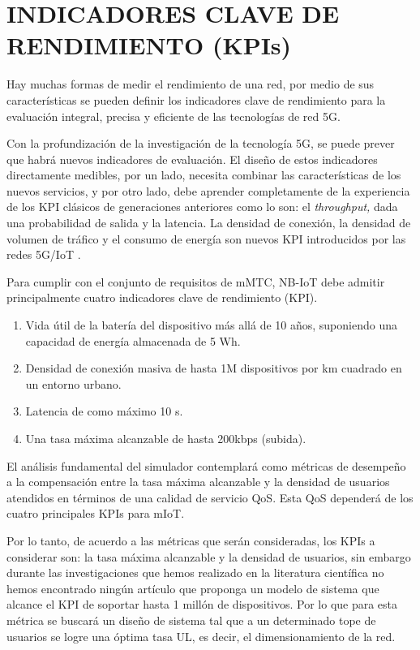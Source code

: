 \section{INDICADORES CLAVE DE RENDIMIENTO (KPIs)}

Hay muchas formas de medir el rendimiento de una red, por medio de sus características se pueden definir los indicadores clave de rendimiento para la evaluación integral, precisa y eficiente de las tecnologías de red 5G.\newline

Con la profundización de la investigación de la tecnología 5G, se puede prever que habrá nuevos indicadores de evaluación. El diseño de estos indicadores directamente medibles, por un lado, necesita combinar las características de los nuevos servicios, y por otro lado, debe aprender completamente de la experiencia de los KPI clásicos de generaciones anteriores como lo son: el \textit{throughput, }dada una\textit{ }probabilidad de salida y la latencia. La densidad de conexión, la densidad de volumen de tráfico y el consumo de energía son nuevos KPI introducidos por las redes 5G/IoT \parencite{WirelessSim}.\newline

Para cumplir con el conjunto de requisitos de mMTC, NB-IoT debe admitir principalmente cuatro indicadores clave de rendimiento (KPI).\newline

\begin{enumerate}
\item  Vida útil de la batería del dispositivo más allá de 10 años, suponiendo una capacidad de energía almacenada de 5 Wh.
\item  Densidad de conexión masiva de hasta 1M dispositivos por km cuadrado en un entorno urbano.
\item  Latencia de como máximo 10 s.
\item  Una tasa máxima alcanzable de hasta 200kbps (subida).
\end{enumerate}

El análisis fundamental del simulador contemplará como métricas de desempeño a la compensación entre la tasa máxima alcanzable y la densidad de usuarios atendidos en términos de una calidad de servicio QoS. Esta QoS dependerá de los cuatro principales KPIs para mIoT.\newline

Por lo tanto, de acuerdo a las métricas que serán consideradas, los KPIs a considerar son: la tasa máxima alcanzable y la densidad de usuarios, sin embargo durante las investigaciones que hemos realizado en la literatura científica no hemos encontrado ningún artículo que proponga un modelo de sistema que alcance el KPI de soportar hasta 1 millón de dispositivos. Por lo que para esta métrica se buscará un diseño de sistema tal que a un determinado tope de usuarios se logre una óptima tasa UL, es decir, el dimensionamiento de la red.

